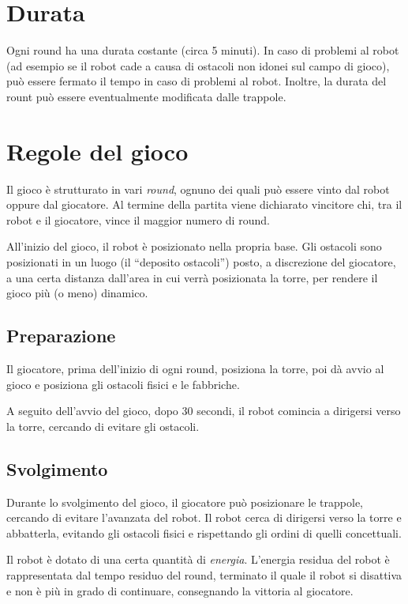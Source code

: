 \section{Durata} 
Ogni round ha una durata costante (circa 5 minuti). In caso di problemi al robot (ad esempio se il robot cade a causa di ostacoli non idonei sul campo di gioco), può essere fermato il tempo in caso di problemi al robot. Inoltre, la durata del rount può essere eventualmente modificata dalle trappole.

\section{Regole del gioco} 
Il gioco è strutturato in vari \emph{round}, ognuno dei quali può essere vinto dal robot oppure dal giocatore. Al termine della partita viene dichiarato vincitore chi, tra il robot e il giocatore, vince il maggior numero di round. %

All'inizio del gioco, il robot è posizionato nella propria base. Gli ostacoli sono posizionati in un luogo (il ``deposito ostacoli'') posto, a discrezione del giocatore, a una certa distanza dall'area in cui verrà posizionata la torre, per rendere il gioco più (o meno) dinamico. %


	\subsection*{Preparazione}
Il giocatore, prima dell'inizio di ogni round, posiziona la torre, poi dà avvio al gioco e posiziona gli ostacoli fisici e le fabbriche.

A seguito dell'avvio del gioco, dopo 30 secondi, il robot comincia a dirigersi verso la torre, cercando di evitare gli ostacoli.
	
	\subsection*{Svolgimento}
	Durante lo svolgimento del gioco, il giocatore può posizionare le trappole, cercando di evitare l'avanzata del robot. Il robot cerca di dirigersi verso la torre e abbatterla, evitando gli ostacoli fisici e rispettando gli ordini di quelli concettuali.

Il robot è dotato di una certa quantità di \emph{energia}. L'energia residua del robot è rappresentata dal tempo residuo del round, terminato il quale il robot si disattiva e non è più in grado di continuare, consegnando la vittoria al giocatore.

